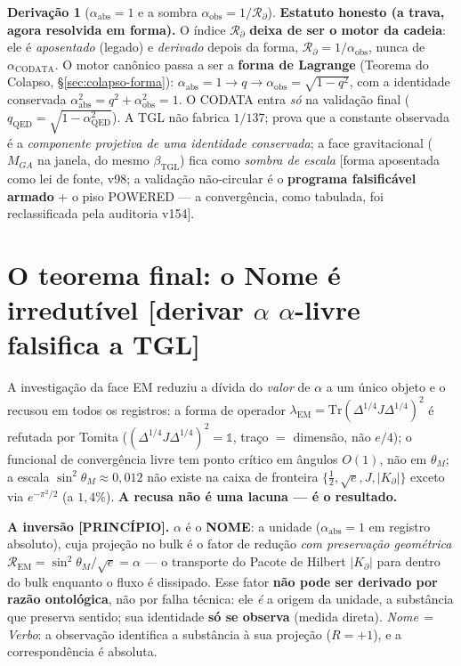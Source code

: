 \documentclass[11pt]{article}
\newcommand{\bTGL}{\beta_{\mathrm{TGL}}}\newcommand{\Msun}{M_{\odot}}\newcommand{\TGL}{\mathrm{TGL}}
\theoremstyle{definition}\newtheorem{deriv}{Derivação}
\begin{document}
\begin{deriv}[$\alpha_{\mathrm{abs}}=1$ e a sombra $\alpha_{\mathrm{obs}}=1/\mathcal{R}_\partial$]
\textbf{Estatuto honesto (a trava, agora resolvida em forma).} O índice $\mathcal{R}_\partial$ \textbf{deixa de ser o motor da cadeia}: ele é \emph{aposentado} (legado) e \emph{derivado} depois da forma, $\mathcal{R}_\partial=1/\alpha_{\mathrm{obs}}$, nunca de $\alpha_{\mathrm{CODATA}}$. O motor canônico passa a ser a \textbf{forma de Lagrange} (Teorema do Colapso, \S\ref{sec:colapso-forma}): $\alpha_{\mathrm{abs}}=1\to q\to\alpha_{\mathrm{obs}}=\sqrt{1-q^2}$, com a identidade conservada $\alpha_{\mathrm{abs}}^2=q^2+\alpha_{\mathrm{obs}}^2=1$. O CODATA entra \emph{só} na validação final ($q_{\mathrm{QED}}=\sqrt{1-\alpha_{\mathrm{QED}}^2}$). A TGL não fabrica $1/137$; prova que a constante observada é a \emph{componente projetiva de uma identidade conservada}; a face gravitacional ($M_{GA}$ na janela, do mesmo $\bTGL$) fica como \emph{sombra de escala} [forma aposentada como lei de fonte, v98; a validação não-circular é o \textbf{programa falsificável armado} + o piso \textsf{POWERED} --- a convergência, como tabulada, foi reclassificada pela auditoria v154].\end{deriv}

\section{O teorema final: o Nome é irredutível \textsf{[derivar $\alpha$ $\alpha$-livre falsifica a TGL]}}\label{sec:nome-irredutivel}

A investigação da face EM reduziu a dívida do \emph{valor} de $\alpha$ a um único objeto e o recusou em todos os registros: a forma de operador $\lambda_{\mathrm{EM}}=\mathrm{Tr}(\Delta^{1/4}J\Delta^{1/4})^2$ é refutada por Tomita ($(\Delta^{1/4}J\Delta^{1/4})^2=\mathbb{1}$, traço $=$ dimensão, não $e/4$); o funcional de convergência livre tem ponto crítico em ângulos $O(1)$, não em $\theta_M$; a escala $\sin^2\theta_M\approx0{,}012$ não existe na caixa de fronteira $\{\tfrac12,\sqrt e, J, |K_\partial|\}$ exceto via $e^{-\pi^2/2}$ (a $1{,}4\%$). \textbf{A recusa não é uma lacuna --- é o resultado.}

\textbf{A inversão \textsf{[PRINCÍPIO]}.} $\alpha$ é o \textbf{NOME}: a unidade ($\alpha_{\mathrm{abs}}=1$ em registro absoluto), cuja projeção no bulk é o fator de redução \emph{com preservação geométrica} $\mathcal{R}_{\mathrm{EM}}=\sin^2\theta_M/\sqrt e=\alpha$ --- o transporte do Pacote de Hilbert $|K_\partial|$ para dentro do bulk enquanto o fluxo é dissipado. Esse fator \textbf{não pode ser derivado por razão ontológica}, não por falha técnica: ele \emph{é} a origem da unidade, a substância que preserva sentido; sua identidade \textbf{só se observa} (medida direta). \emph{Nome$\,=\,$Verbo}: a observação identifica a substância à sua projeção ($R=+1$), e a correspondência é absoluta.
\end{document}
